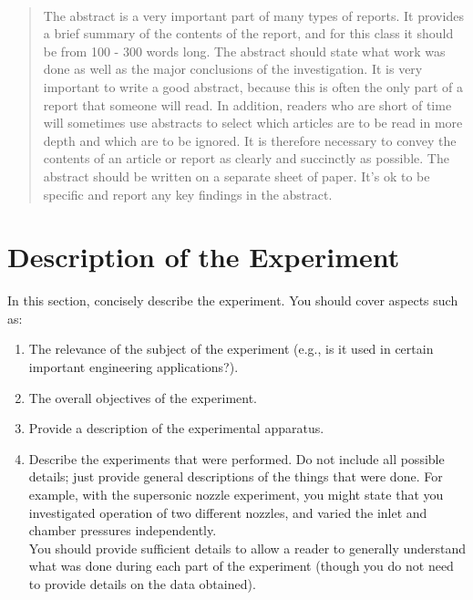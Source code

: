 \documentclass[12pt,letterpaper]{article}       %
\makeatletter
\let\thedate\@date
\makeatother
\begin{document}
\begin{titlepage}
	{\large \thedate}\\[2 cm]
 
	\vfill
	
\end{titlepage}

\begin{abstract}
	The abstract is a very important part of many types of reports. It provides a brief summary of the contents of the report, and for this class it should be from 100 - 300 words long. The abstract should state what work was done as well as the major conclusions of the investigation. It is very important to write a good abstract, because this is often the only part of a report that someone will read. In addition, readers who are short of time will sometimes use abstracts to select which articles are to be read in more depth and which are to be ignored. It is therefore necessary to convey the contents of an article or report as clearly and succinctly as possible.
	The abstract should be written on a separate sheet of paper. It's ok to be specific and report any key findings in the abstract.

	\clearpage
\end{abstract}


\section{Description of the Experiment}

In this section, concisely describe the experiment. You should cover aspects such as:
\begin{enumerate}
	\item The relevance of the subject of the experiment (e.g., is it used in certain important engineering applications?).

	\item The overall objectives of the experiment.

	\item Provide a description of the experimental apparatus.

	\item Describe the experiments that were performed. Do not include all possible details; just provide general descriptions of the things that were done. For example, with the supersonic nozzle experiment, you might state that you investigated operation of two different nozzles, and varied the inlet and chamber pressures independently.\\ 

	You should provide sufficient details to allow a reader to generally understand what was done during each part of the experiment (though you do not need to provide details on the data obtained).	
\end{enumerate}
\end{document}
